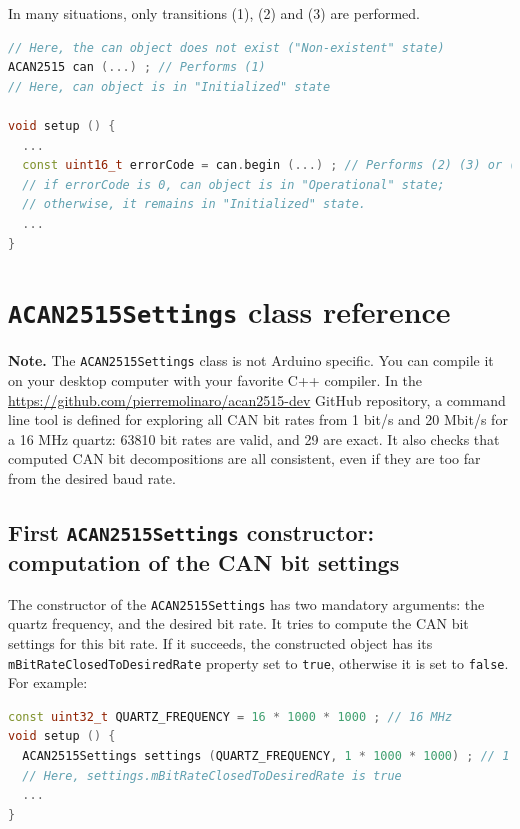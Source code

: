 \documentclass[9pt, a4paper, obeyspaces]{extarticle}
\newcommand \sectionLabel[2]{\section{#1}\label{sec:#2}}
\newcommand \subsectionLabel[2]{\subsection{#1}\label{subsec:#2}}
\begin{document}
In many situations, only transitions (1), (2) and (3) are performed.

{ \small\begin{lstlisting}[language=c++]
// Here, the can object does not exist ("Non-existent" state)
ACAN2515 can (...) ; // Performs (1)
// Here, can object is in "Initialized" state

void setup () {
  ...
  const uint16_t errorCode = can.begin (...) ; // Performs (2) (3) or (2) (4)
  // if errorCode is 0, can object is in "Operational" state;
  // otherwise, it remains in "Initialized" state.
  ...
}
\end{lstlisting}}









\sectionLabel{\texttt{ACAN2515Settings} class reference}{ACAN2515SettingsRef}

{\bf Note. } The \texttt{ACAN2515Settings} class is not Arduino specific. You can compile it on your desktop computer with your favorite C++ compiler. In the \url{https://github.com/pierremolinaro/acan2515-dev} GitHub repository, a command line tool is defined for exploring all CAN bit rates from 1 bit/s and 20 Mbit/s for a 16 MHz quartz: 63810 bit rates are valid, and 29 are exact. It also checks that computed CAN bit decompositions are all consistent, even if they are too far from the desired baud rate.



\subsectionLabel{First \texttt{ACAN2515Settings} constructor: computation of the CAN bit settings}{CANbitSettings}

The constructor of the \texttt{ACAN2515Settings} has two mandatory arguments: the quartz frequency, and the desired bit rate. It tries to compute the CAN bit settings for this bit rate. If it succeeds, the constructed object has its \texttt{mBitRateClosedToDesiredRate} property set to \texttt{true}, otherwise it is set to \texttt{false}. For example:
{ \small\begin{lstlisting}[language=c++]
const uint32_t QUARTZ_FREQUENCY = 16 * 1000 * 1000 ; // 16 MHz
void setup () {
  ACAN2515Settings settings (QUARTZ_FREQUENCY, 1 * 1000 * 1000) ; // 1 Mbit/s
  // Here, settings.mBitRateClosedToDesiredRate is true
  ...
}
\end{lstlisting}}
\end{document}
